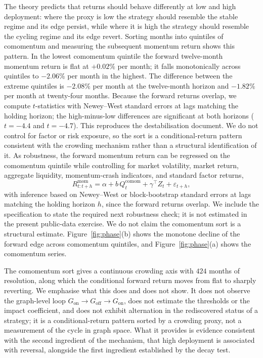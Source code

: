 \documentclass[11pt]{article}
\theoremstyle{plain}
\theoremstyle{definition}
\begin{document}
The theory predicts that returns should behave differently at low and high deployment: where the proxy is low the strategy should resemble the stable regime and its edge persist, while where it is high the strategy should resemble the cycling regime and its edge revert. Sorting months into quintiles of comomentum and measuring the subsequent momentum return shows this pattern. In the lowest comomentum quintile the forward twelve-month momentum return is flat at $+0.02\%$ per month; it falls monotonically across quintiles to $-2.06\%$ per month in the highest. The difference between the extreme quintiles is $-2.08\%$ per month at the twelve-month horizon and $-1.82\%$ per month at twenty-four months. Because the forward returns overlap, we compute $t$-statistics with Newey--West standard errors at lags matching the holding horizon; the high-minus-low differences are significant at both horizons ($t=-4.4$ and $t=-4.7$). This reproduces the destabilisation \citet{lou2022} document. We do not control for factor or risk exposure, so the sort is a conditional-return pattern consistent with the crowding mechanism rather than a structural identification of it. As robustness, the forward momentum return can be regressed on the comomentum quintile while controlling for market volatility, market return, aggregate liquidity, momentum-crash indicators, and standard factor returns,
\[
R^{\mathrm{mom}}_{t:t+h}=\alpha+b\,Q^{\mathrm{comom}}_t+\gamma^\top Z_t+\varepsilon_{t+h},
\]
with inference based on Newey--West or block-bootstrap standard errors at lags matching the holding horizon $h$, since the forward returns overlap. We include the specification to state the required next robustness check; it is not estimated in the present public-data exercise. We do not claim the comomentum sort is a structural estimate. Figure~\ref{fig:phase}(b) shows the monotone decline of the forward edge across comomentum quintiles, and Figure~\ref{fig:phase}(a) shows the comomentum series.

The comomentum sort gives a continuous crowding axis with $424$ months of resolution, along which the conditional forward return moves from flat to sharply reverting. We emphasise what this does and does not show. It does not observe the graph-level loop $G_{\mathrm{on}}\to G_{\mathrm{off}}\to G_{\mathrm{on}}$, does not estimate the thresholds or the impact coefficient, and does not exhibit alternation in the rediscovered status of a strategy; it is a conditional-return pattern sorted by a crowding proxy, not a measurement of the cycle in graph space. What it provides is evidence consistent with the second ingredient of the mechanism, that high deployment is associated with reversal, alongside the first ingredient established by the decay test.
\end{document}
